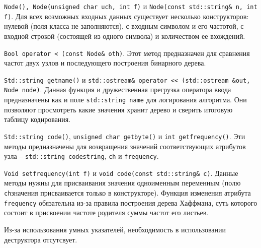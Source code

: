 \texttt{Node(), Node(unsigned char uch, int f)} и \texttt{Node(const std::string\& n, int f)}.
Для всех возможных входных данных существует несколько конструкторов: нулевой (поля класса не заполняются), с входным символом и его частотой, с входной строкой (состоящей из одного символа) и количеством ее вхождений.



\texttt{Bool operator < (const Node\& oth)}.
Этот метод предназначен для сравнения частот двух узлов и последующего построения бинарного дерева.



\texttt{Std::string get{\textunderscore}name()} и \texttt{std::ostream\& operator << (std::ostream \&out, Node node)}.
Данная функция и дружественная прегрузка оператора ввода предназначены как и поле \texttt{std::string name} для логирования алгоритма.
Они позволяют просмотреть какие значения хранит дерево и сверить итоговую таблицу кодирования.



\texttt{Std::string code()}, \texttt{unsigned char get{\textunderscore}byte()} и \texttt{int get{\textunderscore}frequency()}.
Эти методы предназначены для возвращения значений соответствующих атрибутов узла -- \texttt{std::string code{\textunderscore}string}, \texttt{ch} и \texttt{frequency}.



\texttt{Void set{\textunderscore}frequency(int f)} и \texttt{void code(const std::string\& c)}.
Данные методы нужны для присваивания значения одноименным переменным (полю \texttt{ch}значения присваивается только в конструкторе).
Функция изменения атрибута \texttt{frequency} обязательна из-за правила построения дерева Хаффмана, суть которого состоит в присвоении частоте родителя суммы частот его листьев.


Из-за использования умных указателей, необходимость в использовании деструктора отсутсвует.